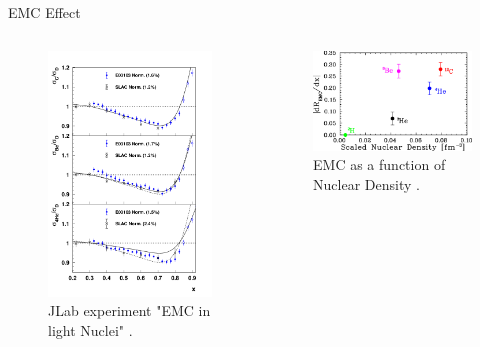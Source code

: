 \documentclass{beamer}
\begin{document}
\begin{frame}{EMC Effect}
	\begin{columns}
		\vspace{-15pt}
		\begin{figure}
			\caption{\label{E03103} JLab experiment "EMC in light Nuclei" \cite{E3103}.}
			\vspace{-20pt}
			\includegraphics[width =5cm]{../images/carbon_be_he4}
		\end{figure}
		\hspace{10pt}
		\begin{figure}
			\caption{\label{E03103_1} EMC as a function of Nuclear Density \cite{E3103}.}
			\includegraphics[width =6cm]{../images/PRL_slopes}
		\end{figure}
	\end{columns}
\end{frame}
\end{document}
